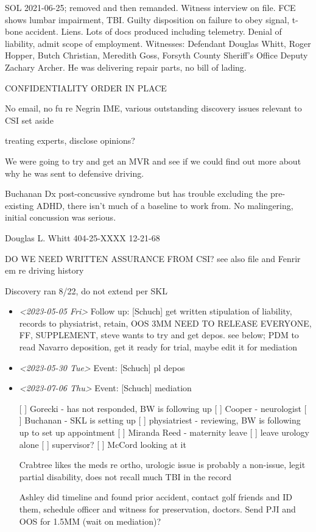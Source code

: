 \documentclass[11pt]{article}
\begin{document}
SOL 2021-06-25; removed and then remanded. Witness interview on file. FCE shows lumbar impairment, TBI. Guilty disposition on failure to obey signal, t-bone accident. Liens. Lots of docs produced including telemetry. Denial of liability, admit scope of employment. Witnesses: Defendant Douglas Whitt, Roger Hopper, Butch Christian, Meredith Goss, Forsyth County Sheriff’s Office Deputy Zachary Archer. He was delivering repair parts, no bill of lading. 

CONFIDENTIALITY ORDER IN PLACE

No email, no fu re Negrin IME, various outstanding discovery issues relevant to CSI set aside

treating experts, disclose opinions?

We were going to try and get an MVR and see if we could find out more about why he was sent to defensive driving.

Buchanan Dx post-concussive syndrome but has trouble excluding the pre-existing ADHD, there isn't much of a baseline to work from. No malingering, initial concussion was serious.

Douglas L. Whitt
404-25-XXXX 
12-21-68

DO WE NEED WRITTEN ASSURANCE FROM CSI?  see also file and Fenrir em re driving history

Discovery ran 8/22, do not extend per SKL

\begin{itemize}
\item \textit{<2023-05-05 Fri> } Follow up: [Schuch] get written stipulation of liability, records to physiatrist, retain, OOS 3MM NEED TO RELEASE EVERYONE, FF, SUPPLEMENT, steve wants to try and get depos. see below; PDM to read Navarro deposition, get it ready for trial, maybe edit it for mediation

\item \textit{<2023-05-30 Tue> } Event: [Schuch] pl depos

\item \textit{<2023-07-06 Thu> } Event: [Schuch] mediation

[ ] Gorecki - has not responded, BW is following up
[ ] Cooper - neurologist
[ ] Buchanan - SKL is setting up
[ ] physiatriest - reviewing, BW is following up to set up appointment
[ ] Miranda Reed - maternity leave
[ ] leave urology alone
[ ] supervisor?
[ ] McCord looking at it

Crabtree likes the meds re ortho, urologic issue is probably a non-issue, legit partial disability, does not recall much TBI in the record

Ashley did timeline and found prior accident, contact golf friends and ID them, schedule officer and witness for preservation, doctors. Send PJI and OOS for 1.5MM (wait on mediation)?
\end{itemize}
\end{document}
